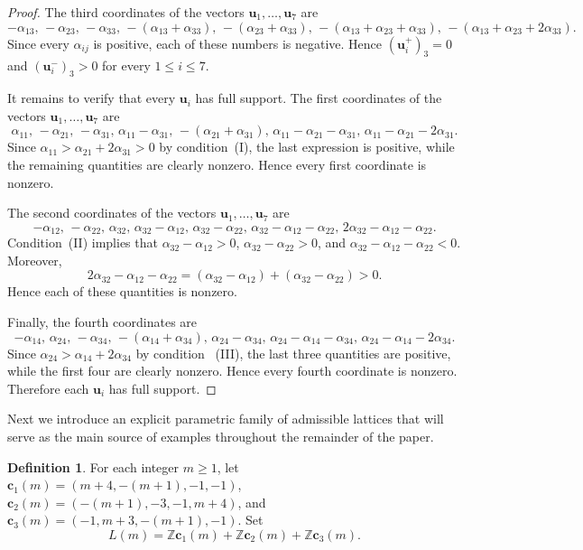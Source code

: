 \documentclass[12pt,a4paper]{amsart}
\theoremstyle{definition}
\newtheorem{definition}[theorem]{Definition}
\begin{document}
\begin{proof}
The third coordinates of the vectors
$\mathbf u_1,\ldots,\mathbf u_7$ are
\[
-\alpha_{13},\,
-\alpha_{23},\,
-\alpha_{33},\,
-(\alpha_{13}+\alpha_{33}),\,
-(\alpha_{23}+\alpha_{33}),\,
-(\alpha_{13}+\alpha_{23}+\alpha_{33}),\,
-(\alpha_{13}+\alpha_{23}+2\alpha_{33}).
\]
Since every $\alpha_{ij}$ is positive, each of these numbers is
negative. Hence
$
(\mathbf u_i^+)_3=0$ and $(\mathbf u_i^-)_3>0$ for every $1\le i\le7$.

It remains to verify that every $\mathbf u_i$ has full support.
The first coordinates of the vectors
$\mathbf u_1,\ldots,\mathbf u_7$ are
\[
\alpha_{11},\,
-\alpha_{21},\,
-\alpha_{31},\,
\alpha_{11}-\alpha_{31},\,
-(\alpha_{21}+\alpha_{31}),\,
\alpha_{11}-\alpha_{21}-\alpha_{31},\,
\alpha_{11}-\alpha_{21}-2\alpha_{31}.
\]
Since
$
\alpha_{11}>\alpha_{21}+2\alpha_{31}>0$
by condition~\textup{(I)}, the last expression is positive, while the
remaining quantities are clearly nonzero. Hence every first coordinate
is nonzero.

The second coordinates of the vectors
$\mathbf u_1,\ldots,\mathbf u_7$ are
\[
-\alpha_{12},\,
-\alpha_{22},\,
\alpha_{32},\,
\alpha_{32}-\alpha_{12},\,
\alpha_{32}-\alpha_{22},\,
\alpha_{32}-\alpha_{12}-\alpha_{22},\,
2\alpha_{32}-\alpha_{12}-\alpha_{22}.
\]
Condition~\textup{(II)} implies that
$\alpha_{32}-\alpha_{12}>0$, $\alpha_{32}-\alpha_{22}>0$, and 
$\alpha_{32}-\alpha_{12}-\alpha_{22}<0.$
Moreover,
\[
2\alpha_{32}-\alpha_{12}-\alpha_{22}
=
(\alpha_{32}-\alpha_{12})
+
(\alpha_{32}-\alpha_{22})
>
0.
\]
Hence each of these quantities is nonzero.

Finally, the fourth coordinates are
\[
-\alpha_{14},\,
\alpha_{24},\,
-\alpha_{34},\,
-(\alpha_{14}+\alpha_{34}),\,
\alpha_{24}-\alpha_{34},\,
\alpha_{24}-\alpha_{14}-\alpha_{34},\,
\alpha_{24}-\alpha_{14}-2\alpha_{34}.
\]
Since $ \alpha_{24}>\alpha_{14}+2\alpha_{34}$ by condition ~\textup{(III)}, the last three quantities are positive, while the first four are clearly nonzero. Hence every fourth coordinate is nonzero. Therefore each $\mathbf u_i$
has full support.
\end{proof}

Next we introduce an explicit parametric family of admissible lattices that will serve as the main source of examples throughout the remainder of the paper.

\begin{definition}\label{def:family}
For each integer $m\ge1$, let $\mathbf c_1(m)=(m+4,-(m+1),-1,-1)$,
$\mathbf c_2(m)=(-(m+1),-3,-1,m+4)$, and
$\mathbf c_3(m)=(-1,m+3,-(m+1),-1)$. Set
\[
L(m)=
\mathbb Z\mathbf c_1(m)+
\mathbb Z\mathbf c_2(m)+
\mathbb Z\mathbf c_3(m).
\]
\end{definition}
\end{document}

